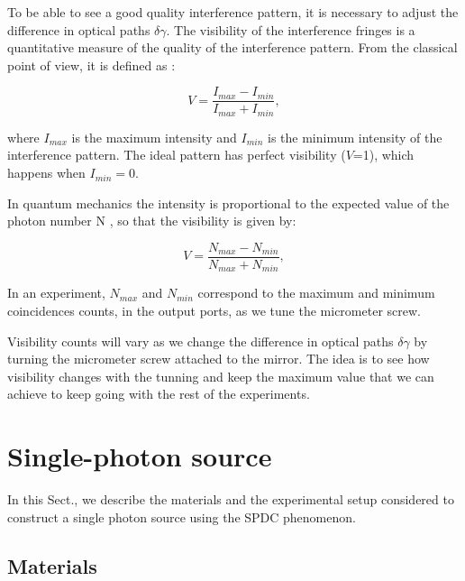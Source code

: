 \documentclass[12pt]{book}
\begin{document}
To be able to see a good quality interference pattern, it is necessary to adjust the difference in optical paths $\delta \gamma$. The visibility of the interference fringes is a quantitative measure of the quality of the interference pattern. From the classical point of view, it is defined as \cite{hecht}:

\begin{equation}
V=\frac{I_{max}-I_{min}}{I_{max}+I_{min}},
\end{equation}

where $I_{max}$ is the maximum intensity and $I_{min}$ is the minimum intensity of the interference pattern. The ideal pattern has perfect visibility ($V$=1), which happens when $I_{min}=0$.

In quantum mechanics the intensity is proportional to the expected value of the photon number N \cite {glauber}, so that the visibility is given by:

\begin{equation}
V=\frac{N_{max}-N_{min}}{N_{max}+N_{min}},
\end{equation}

In an experiment, $N_{max}$ and $N_{min}$ correspond to the maximum and minimum coincidences counts, in the output ports, as we tune the micrometer screw.

Visibility counts will vary as we change the difference in optical paths $\delta\gamma$ by turning the micrometer screw attached to the mirror. The idea is to see how visibility changes with the tunning and keep the maximum value that we can achieve to keep going with the rest of the experiments.

\section{Single-photon source}



In this Sect., we describe the materials and the experimental setup considered to construct a single photon source using the SPDC phenomenon.


\subsection{Materials}
\end{document}
